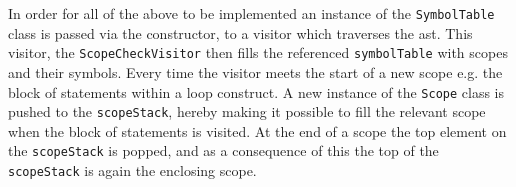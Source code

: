 In order for all of the above to be implemented an instance of the \texttt{SymbolTable} class is passed via the constructor, to a visitor which traverses the \acrshort{ast}.
This visitor, the \texttt{ScopeCheckVisitor} then fills the referenced \texttt{symbolTable} with scopes and their symbols.
Every time the visitor meets the start of a new scope e.g. the block of statements within a loop construct.
A new instance of the \texttt{Scope} class is pushed to the \texttt{scopeStack}, hereby making it possible to fill the relevant scope when the block of statements is visited.
At the end of a scope the top element on the \texttt{scopeStack} is popped, and as a consequence of this the top of the \texttt{scopeStack} is again the enclosing scope.
